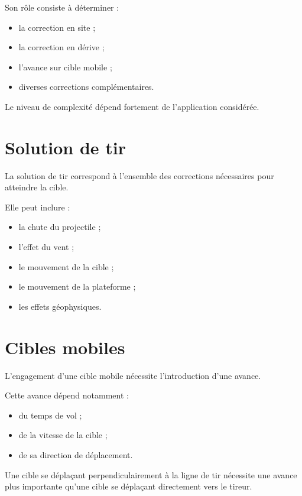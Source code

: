 Son rôle consiste à déterminer :

\begin{itemize}
    \item la correction en site ;
    \item la correction en dérive ;
    \item l'avance sur cible mobile ;
    \item diverses corrections complémentaires.
\end{itemize}

Le niveau de complexité dépend fortement de l'application considérée.

\section{Solution de tir}

La solution de tir correspond à l'ensemble des corrections nécessaires pour
atteindre la cible.

Elle peut inclure :

\begin{itemize}
    \item la chute du projectile ;
    \item l'effet du vent ;
    \item le mouvement de la cible ;
    \item le mouvement de la plateforme ;
    \item les effets géophysiques.
\end{itemize}

\section{Cibles mobiles}

L'engagement d'une cible mobile nécessite l'introduction d'une avance.

Cette avance dépend notamment :

\begin{itemize}
    \item du temps de vol ;
    \item de la vitesse de la cible ;
    \item de sa direction de déplacement.
\end{itemize}

\begin{exemple}

Une cible se déplaçant perpendiculairement à la ligne de tir nécessite une
avance plus importante qu'une cible se déplaçant directement vers le tireur.

\end{exemple}

